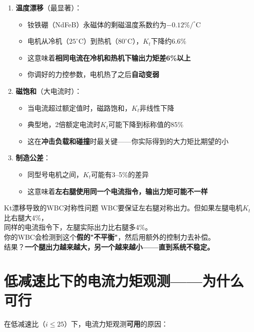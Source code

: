 \begin{enumerate}
  \item \textbf{温度漂移}（最显著）：
  \begin{itemize}
    \item 钕铁硼（NdFeB）永磁体的剩磁温度系数约为$-0.12\%/^\circ$C
    \item 电机从冷机（$25^\circ$C）到热机（$80^\circ$C），$K_t$下降约6.6\%
    \item 这意味着\textbf{相同电流在冷机和热机下输出力矩差6\%以上}
    \item 你调好的力控参数，电机热了之后\textbf{自动变弱}
  \end{itemize}
  
  \item \textbf{磁饱和}（大电流时）：
  \begin{itemize}
    \item 当电流超过额定值时，磁路饱和，$K_t$非线性下降
    \item 典型地，2倍额定电流时$K_t$可能下降到标称值的85\%
    \item 这在\textbf{冲击负载和碰撞}时最关键——你实际得到的大力矩比期望的小
  \end{itemize}
  
  \item \textbf{制造公差}：
  \begin{itemize}
    \item 同型号电机之间，$K_t$可能有3--5\%的差异
    \item 这意味着\textbf{左右腿使用同一个电流指令，输出力矩可能不一样}
  \end{itemize}
\end{enumerate}

\begin{cautionbox}{Kt漂移导致的WBC对称性问题}
WBC要保证左右腿对称出力。但如果左腿电机$K_t$比右腿大4\%，\\
同样的电流指令下，左腿实际出力比右腿多4\%。\\
你的WBC会检测到这个\textbf{假的"不平衡"}，然后用额外的控制力去补偿。\\
结果？\textbf{一个腿出力越来越大，另一个越来越小——直到系统不稳定。}
\end{cautionbox}

\section{低减速比下的电流力矩观测——为什么可行}

在低减速比（$i \leq 25$）下，电流力矩观测\textbf{可用}的原因：

